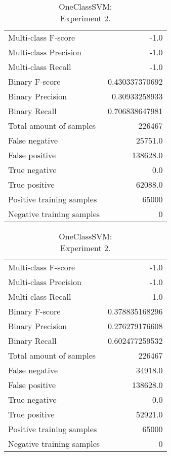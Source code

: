 \begin{table}[H]
\begin{minipage}{0.5\textwidth}

\caption{OneClassSVM: \\Experiment 1.}

\centering
\begin{tabular}{l r}
\toprule
Multi-class F-score & -1.0 \\
Multi-class Precision & -1.0 \\
Multi-class Recall & -1.0 \\
\midrule
Binary F-score & 0.430337370692 \\
Binary Precision & 0.30933258933 \\
Binary Recall & 0.706838647981 \\
\midrule
Total amount of samples & 226467 \\
False negative & 25751.0 \\
False positive & 138628.0 \\
True negative & 0.0 \\
True positive & 62088.0 \\
\midrule
Positive training samples & 65000 \\
Negative training samples & 0 \\
\bottomrule
\end{tabular}

\end{minipage}
\hfillx
\begin{minipage}{0.5\textwidth}
\caption{OneClassSVM: \\Experiment 2.}

\centering
\begin{tabular}{l r}
\toprule
Multi-class F-score & -1.0 \\
Multi-class Precision & -1.0 \\
Multi-class Recall & -1.0 \\
\midrule
Binary F-score & 0.378835168296 \\
Binary Precision & 0.276279176608 \\
Binary Recall & 0.602477259532 \\
\midrule
Total amount of samples & 226467 \\
False negative & 34918.0 \\
False positive & 138628.0 \\
True negative & 0.0 \\
True positive & 52921.0 \\
\midrule
Positive training samples & 65000 \\
Negative training samples & 0 \\
\bottomrule
\end{tabular}
\end{minipage}
\end{table}
